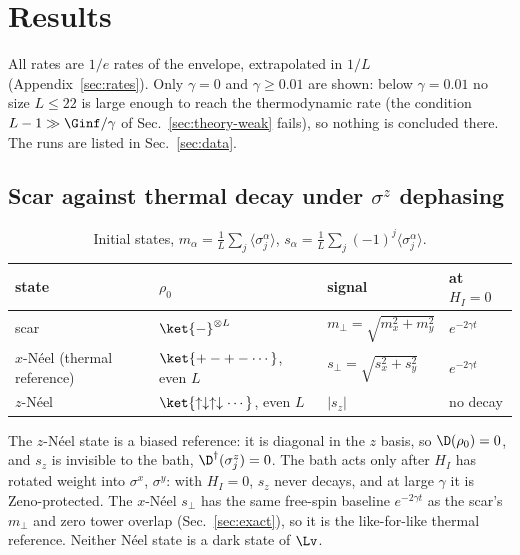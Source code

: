 \section{Results}
\label{sec:results}

All rates are $1/e$ rates of the envelope, extrapolated in $1/L$ (Appendix~\ref{sec:rates}). Only $\gamma = 0$ and $\gamma \ge 0.01$ are shown: below $\gamma = 0.01$ no size $L \le 22$ is large enough to reach the thermodynamic rate (the condition $L - 1 \gg \Ginf/\gamma$ of Sec.~\ref{sec:theory-weak} fails), so nothing is concluded there. The runs are listed in Sec.~\ref{sec:data}.

\subsection{Scar against thermal decay under $\sigma^z$ dephasing}
\label{sec:states}

\begin{table}[H]
\centering
\begin{tabular}{llll}
\toprule
state & $\rho_0$ & signal & at $H_I = 0$ \\
\midrule
scar & $\ket{-}^{\otimes L}$ & $m_\perp = \sqrt{m_x^2 + m_y^2}$ & $e^{-2\gamma t}$ \\
$x$-N\'eel (thermal reference) & $\ket{+-+-\cdots}$, even $L$ & $s_\perp = \sqrt{s_x^2 + s_y^2}$ & $e^{-2\gamma t}$ \\
$z$-N\'eel & $\ket{\uparrow\downarrow\uparrow\downarrow\cdots}$, even $L$ & $\lvert s_z\rvert$ & no decay \\
\bottomrule
\end{tabular}
\caption{Initial states, $m_\alpha = \frac1L\sum_j\langle\sigma^\alpha_j\rangle$, $s_\alpha = \frac1L\sum_j(-1)^j\langle\sigma^\alpha_j\rangle$.}
\label{tab:states}
\end{table}

The $z$-N\'eel state is a biased reference: it is diagonal in the $z$ basis, so $\D(\rho_0) = 0$, and $s_z$ is invisible to the bath, $\D^\dagger(\sigma^z_j) = 0$. The bath acts only after $H_I$ has rotated weight into $\sigma^x$, $\sigma^y$: with $H_I = 0$, $s_z$ never decays, and at large $\gamma$ it is Zeno-protected. The $x$-N\'eel $s_\perp$ has the same free-spin baseline $e^{-2\gamma t}$ as the scar's $m_\perp$ and zero tower overlap (Sec.~\ref{sec:exact}), so it is the like-for-like thermal reference. Neither N\'eel state is a dark state of $\Lv$.

